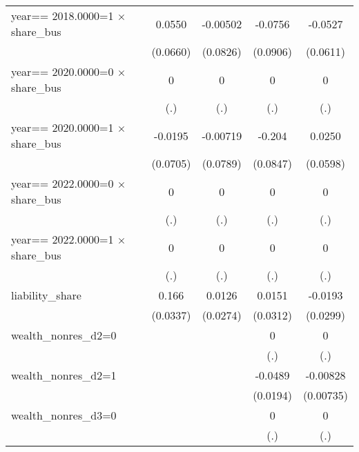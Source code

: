 \begin{table}[htbp]
\begin{tabular}{l*{4}{c}}
year==  2018.0000=1 $\times$ share\_bus&   0.0550         & -0.00502         &  -0.0756         &  -0.0527         \\
                & (0.0660)         & (0.0826)         & (0.0906)         & (0.0611)         \\
\addlinespace
year==  2020.0000=0 $\times$ share\_bus&        0         &        0         &        0         &        0         \\
                &      (.)         &      (.)         &      (.)         &      (.)         \\
\addlinespace
year==  2020.0000=1 $\times$ share\_bus&  -0.0195         & -0.00719         &   -0.204\sym{**} &   0.0250         \\
                & (0.0705)         & (0.0789)         & (0.0847)         & (0.0598)         \\
\addlinespace
year==  2022.0000=0 $\times$ share\_bus&        0         &        0         &        0         &        0         \\
                &      (.)         &      (.)         &      (.)         &      (.)         \\
\addlinespace
year==  2022.0000=1 $\times$ share\_bus&        0         &        0         &        0         &        0         \\
                &      (.)         &      (.)         &      (.)         &      (.)         \\
\addlinespace
liability\_share &    0.166\sym{***}&   0.0126         &   0.0151         &  -0.0193         \\
                & (0.0337)         & (0.0274)         & (0.0312)         & (0.0299)         \\
\addlinespace
wealth\_nonres\_d2=0&                  &                  &        0         &        0         \\
                &                  &                  &      (.)         &      (.)         \\
\addlinespace
wealth\_nonres\_d2=1&                  &                  &  -0.0489\sym{**} & -0.00828         \\
                &                  &                  & (0.0194)         &(0.00735)         \\
\addlinespace
wealth\_nonres\_d3=0&                  &                  &        0         &        0         \\
                &                  &                  &      (.)         &      (.)         \\

\end{tabular}
\end{table}
